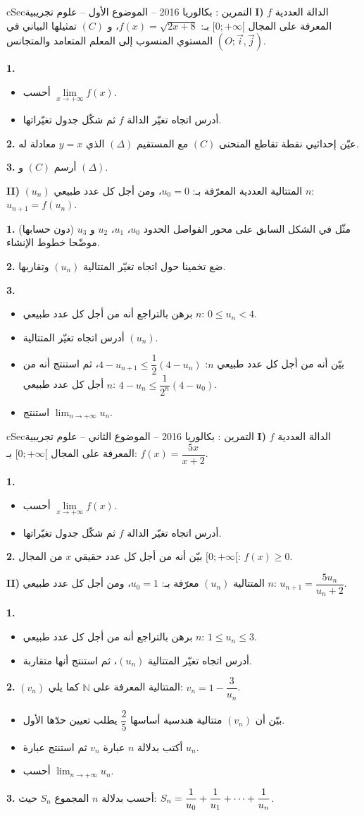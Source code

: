 \documentclass[12pt,a4paper]{article}
\newenvironment{BOX}[2]{\begin{otherlanguage}{english}\begin{arbox}{#1}{#2}}{\end{arbox}\end{otherlanguage}}
\newcounter{exo}
\newenvironment{tamrin}[1]{\stepcounter{exo}\begin{BOX}{cSec}{التمرين \theexo: #1}}{\end{BOX}}
\renewcommand{\cdots}{\mathinner{\cdotp\cdotp\cdotp}}
\newcommand{\N}{\mathbb{N}}
\newcommand{\limn}{\displaystyle\lim_{n\to+\infty}}
\newenvironment{sq}{\begin{itemize}[leftmargin=2.4em,itemsep=3pt]}{\end{itemize}}
\newcommand{\qa}{\item[(أ)]}\newcommand{\qb}{\item[(ب)]}\newcommand{\qc}{\item[(جـ)]}\newcommand{\qd}{\item[(د)]}\newcommand{\qe}{\item[(هـ)]}
\newcommand{\QQ}[1]{\par\smallskip\textbf{#1.} }
\begin{document}
\begin{tamrin}{بكالوريا 2016 -- الموضوع الأول -- علوم تجريبية}
\textbf{I)} $f$ الدالة العددية المعرفة على المجال $[0;+\infty[$ بـ: $f(x)=\sqrt{2x+8}$، و $(C)$ تمثيلها البياني في المستوي المنسوب إلى المعلم المتعامد والمتجانس $(O;\vec i,\vec j)$.
\QQ{1}
\begin{sq}
\qa أحسب $\lim\limits_{x\to+\infty}f(x)$.
\qb أدرس اتجاه تغيّر الدالة $f$ ثم شكّل جدول تغيّراتها.
\end{sq}
\QQ{2} عيّن إحداثيي نقطة تقاطع المنحنى $(C)$ مع المستقيم $(\Delta)$ الذي $y=x$ معادلة له.
\QQ{3} أرسم $(C)$ و $(\Delta)$.

\textbf{II)} $(u_n)$ المتتالية العددية المعرّفة بـ: $u_0=0$، ومن أجل كل عدد طبيعي $n$: $u_{n+1}=f(u_n)$.
\QQ{1} مثّل في الشكل السابق على محور الفواصل الحدود $u_0$، $u_1$، $u_2$ و $u_3$ (دون حسابها) موضّحا خطوط الإنشاء.
\QQ{2} ضع تخمينا حول اتجاه تغيّر المتتالية $(u_n)$ وتقاربها.
\QQ{3}
\begin{sq}
\qa برهن بالتراجع أنه من أجل كل عدد طبيعي $n$: $0\leqslant u_n<4$.
\qb أدرس اتجاه تغيّر المتتالية $(u_n)$.
\qc بيّن أنه من أجل كل عدد طبيعي $n$: $4-u_{n+1}\leqslant\dfrac12(4-u_n)$، ثم استنتج أنه من أجل كل عدد طبيعي $n$: $4-u_n\leqslant\dfrac{1}{2^n}(4-u_0)$.
\qd استنتج $\limn u_n$.
\end{sq}
\end{tamrin}

\begin{tamrin}{بكالوريا 2016 -- الموضوع الثاني -- علوم تجريبية}
\textbf{I)} $f$ الدالة العددية المعرفة على المجال $[0;+\infty[$ بـ: $f(x)=\dfrac{5x}{x+2}$.
\QQ{1}
\begin{sq}
\qa أحسب $\lim\limits_{x\to+\infty}f(x)$.
\qb أدرس اتجاه تغيّر الدالة $f$ ثم شكّل جدول تغيّراتها.
\end{sq}
\QQ{2} بيّن أنه من أجل كل عدد حقيقي $x$ من المجال $[0;+\infty[$: $f(x)\geqslant 0$.

\textbf{II)} المتتالية $(u_n)$ معرّفة بـ: $u_0=1$، ومن أجل كل عدد طبيعي $n$: $u_{n+1}=\dfrac{5u_n}{u_n+2}$.
\QQ{1}
\begin{sq}
\qa برهن بالتراجع أنه من أجل كل عدد طبيعي $n$: $1\leqslant u_n\leqslant 3$.
\qb أدرس اتجاه تغيّر المتتالية $(u_n)$، ثم استنتج أنها متقاربة.
\end{sq}
\QQ{2} $(v_n)$ المتتالية المعرفة على $\N$ كما يلي: $v_n=1-\dfrac{3}{u_n}$.
\begin{sq}
\qa بيّن أن $(v_n)$ متتالية هندسية أساسها $\dfrac25$ يطلب تعيين حدّها الأول.
\qb أكتب بدلالة $n$ عبارة $v_n$ ثم استنتج عبارة $u_n$.
\qc أحسب $\limn u_n$.
\end{sq}
\QQ{3} أحسب بدلالة $n$ المجموع $S_n$ حيث: $S_n=\dfrac{1}{u_0}+\dfrac{1}{u_1}+\cdots+\dfrac{1}{u_n}$.
\end{tamrin}
\end{document}
